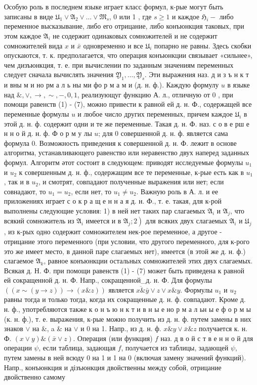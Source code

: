 \documentclass[10pt]{article}
\begin{document}
Особую роль в последнем языке играет класс формул, к-рые могут быть записаны в виде $\mathfrak{U}_{1} \vee \mathfrak{A}_{2} \vee \ldots \vee \mathfrak{M}_{s}$, 0 или 1 , где $s \geqslant 1$ и каждое $\mathfrak{H}_{i}-$ либо переменное высказывание, либо его отрицание, либо конъюнкция таковых, при этом каждое $\mathfrak{A}_{i}$ не содержит одинаковых сомножителей и не содержит сомножителей вида $x$ и $\bar{x}$ одновременно и все $\mathfrak{U}_{i}$ попарно не равны. Здесь скобки опускаются, т. к. предполагается, что операция конъюнкции связывает «сильнее», чем дизъюнкция, т. е. при вычислении по заданным значениям переменных следует сначала вычислять значения $\mathfrak{Y}_{1}, \ldots, \mathfrak{Y}_{s}$. Эти выражения наз. д и з ъ н к т и вны м и но рм а л ь ны ми фо р м а м и (д. н. ф.). Каждую формулу $u$ в языке над $\&, \vee, \rightarrow, \sim,-, 0,1$, реализующуг функцию А. л., отличную от 0 , при помощи равенств (1) - (7), можно привести к равной ей д. н. Ф., содержащей все переменные формулы $u$ и любое число других переменных, причем каждое $\mathfrak{U}_{i}$ в этой д. н. ф. содержит одни и те же переменные. Такая д. н. Ф. наз. с о в е рш е н н о й д. н. ф. Ф о р м у лы $u$; для 0 совершенной д. н. ф. является сама формула 0. Возможность приведения к совершенной д. н. Ф. лежит в основе алгоритма, устанавливающего равенство или неравенство двух наперед заданных формул. Алгоритм әтот состоит в следующем: приводят исследуемые формулы $u_{1}$ и $u_{2}$ к совершенным д. н. ф., содержащим все те переменные, к-рые есть как в $u_{1}$, так и в $u_{2}$, и смотрят, совпадают полученные выражения или нет; если совнадают, то $u_{1}=u_{2}$, если нет, то $u_{1} \neq u_{2}$. Важную роль в А. л. и ее приложениях играет с о к р а щ е н н а я д. н. Ф., т. е. такая, для к-рой выполнены следующие условия: 1) в ней нет таких пар слагаемых $\mathfrak{A}_{i}$ и $\mathfrak{A}_{j}$, что всякий сомножитель из $\mathfrak{A}_{i}$ имеется и в $\left.\mathfrak{A}_{j} ; 2\right)$ для всяких двух слагаемых $\mathfrak{A}_{i}$ и $\mathfrak{U}_{j}$, из к-рых одно содержит сомножителем нек-рое переменное, а другое - отрицание этого переменного (при условии, что другого переменного, для к-рого это же имеет место, в данной паре слагаемых нет), имеется (в этой же д. н. ф.) слагаемое $\mathfrak{A}_{k}$, равное конъюнкции остальных сомножителей этих двух слагаемых. Всякая д. Н. Ф. при помощи равенств (1) - (7) может быть приведена к равной ей сокращенной д. н. Ф. Напр., сокращенной\_д. н. Ф. Для формулы $((x \sim(y \rightarrow z)) \rightarrow(x \& z))$ является $\overline{x \&} \bar{y} \vee z \vee x \& y$. Формулы $u_{1}$ и $u_{2}$ равны тогда и только тогда, когда их сокращенные д. н. ф. совпадают. Кроме д. н. ф., употребляются также к о н ъ ю н к т и в н ы е но р м а л ьн ы е ф о р м ы (к. н. ф.), т. е. выражения, к-рые можно получить из д. н. ф. путем замены в них знаков $\vee$ на \&, a \& на $\vee$ и 0 на 1. Напр., из д. н. ф. $x \& y \vee \bar{x} \& z$ получается к. н. Ф. $(x \vee y) \&(\bar{x} \vee z)$. Операция (или функция) $f$ наз. д в о й с т в е н н о й для операции $\psi$, если таблица, задающая $f$, получается из таблицы, задающей $\psi$, путем замены в ней всюду 0 на 1 и 1 на 0 (включая замену значений функций). Напр., конъюнкция и дізъюнкция двойственны между собой, отрицание двойственно самому 
\end{document}
